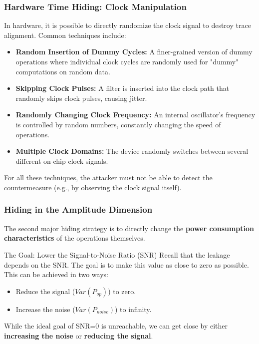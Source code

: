 \begin{frame}
    \frametitle{Hardware Time Hiding: Clock Manipulation}

    In hardware, it is possible to directly randomize the clock signal to destroy trace alignment. Common techniques include:

    \begin{itemize}
        \item \textbf{Random Insertion of Dummy Cycles:} A finer-grained version of dummy operations where individual clock cycles are randomly used for "dummy" computations on random data.

        \item \textbf{Skipping Clock Pulses:} A filter is inserted into the clock path that randomly skips clock pulses, causing jitter.

        \item \textbf{Randomly Changing Clock Frequency:} An internal oscillator's frequency is controlled by random numbers, constantly changing the speed of operations.

        \item \textbf{Multiple Clock Domains:} The device randomly switches between several different on-chip clock signals.
    \end{itemize}

    \begin{alertblock}{}
        For all these techniques, the attacker must not be able to detect the countermeasure (e.g., by observing the clock signal itself).
    \end{alertblock}

\end{frame}

\begin{frame}
    \frametitle{Hiding in the Amplitude Dimension}

    The second major hiding strategy is to directly change the \textbf{power consumption characteristics} of the operations themselves.

    \begin{block}{The Goal: Lower the Signal-to-Noise Ratio (SNR)}
        Recall that the leakage depends on the SNR. The goal is to make this value as close to zero as possible. This can be achieved in two ways:
        \begin{itemize}
            \item Reduce the signal ($Var(P_{op})$) to zero.
            \item Increase the noise ($Var(P_{noise})$) to infinity.
        \end{itemize}
    \end{block}
    
    While the ideal goal of SNR=0 is unreachable, we can get close by either \textbf{increasing the noise} or \textbf{reducing the signal}.

\end{frame}

